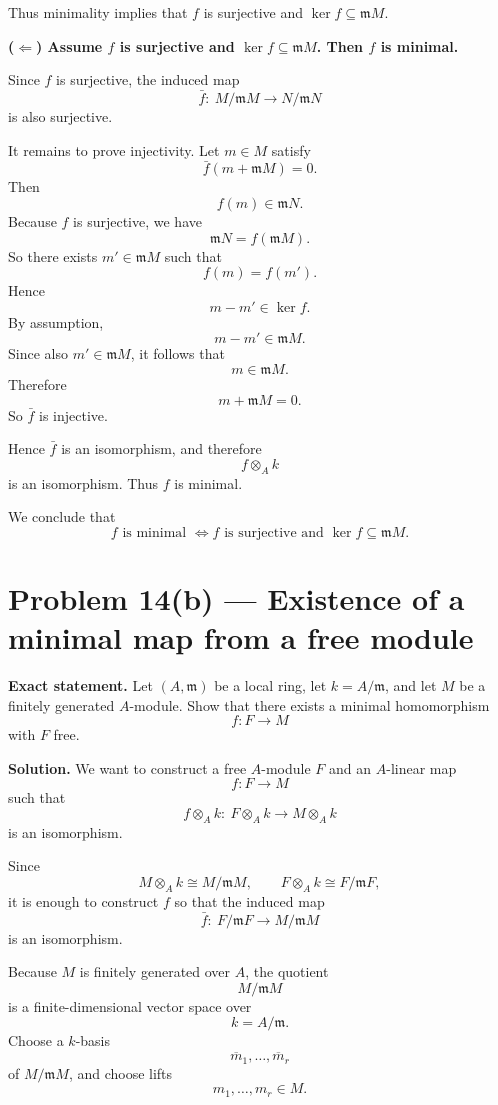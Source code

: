 \documentclass[12pt,a4paper,oneside]{report}
\theoremstyle{notespace}
\begin{document}
Thus minimality implies that \(f\) is surjective and \(\ker f\subseteq \mathfrak m M\).

\medskip

\textbf{(\(\Leftarrow\)) Assume \(f\) is surjective and \(\ker f\subseteq \mathfrak m M\). Then \(f\) is minimal.}

Since \(f\) is surjective, the induced map
\[
\bar f:\ M/\mathfrak m M \to N/\mathfrak m N
\]
is also surjective.

It remains to prove injectivity. Let \(m\in M\) satisfy
\[
\bar f(m+\mathfrak m M)=0.
\]
Then
\[
f(m)\in \mathfrak m N.
\]
Because \(f\) is surjective, we have
\[
\mathfrak m N=f(\mathfrak m M).
\]
So there exists \(m'\in \mathfrak m M\) such that
\[
f(m)=f(m').
\]
Hence
\[
m-m'\in \ker f.
\]
By assumption,
\[
m-m'\in \mathfrak m M.
\]
Since also \(m'\in \mathfrak m M\), it follows that
\[
m\in \mathfrak m M.
\]
Therefore
\[
m+\mathfrak m M=0.
\]
So \(\bar f\) is injective.

Hence \(\bar f\) is an isomorphism, and therefore
\[
f\otimes_A k
\]
is an isomorphism. Thus \(f\) is minimal.

\medskip

We conclude that
\[
\boxed{
f \text{ is minimal }
\iff
f \text{ is surjective and } \ker f\subseteq \mathfrak m M.
}
\]

\section{Problem 14(b) --- Existence of a minimal map from a free module}

\textbf{Exact statement.}
Let \((A,\mathfrak m)\) be a local ring, let \(k=A/\mathfrak m\), and let \(M\) be a finitely generated \(A\)-module. Show that there exists a minimal homomorphism
\[
f:F\to M
\]
with \(F\) free.

\textbf{Solution.}
We want to construct a free \(A\)-module \(F\) and an \(A\)-linear map
\[
f:F\to M
\]
such that
\[
f\otimes_A k:\ F\otimes_A k \to M\otimes_A k
\]
is an isomorphism.

Since
\[
M\otimes_A k \cong M/\mathfrak m M,
\qquad
F\otimes_A k \cong F/\mathfrak m F,
\]
it is enough to construct \(f\) so that the induced map
\[
\bar f:\ F/\mathfrak m F \to M/\mathfrak m M
\]
is an isomorphism.

Because \(M\) is finitely generated over \(A\), the quotient
\[
M/\mathfrak m M
\]
is a finite-dimensional vector space over
\[
k=A/\mathfrak m.
\]
Choose a \(k\)-basis
\[
\overline{m}_1,\dots,\overline{m}_r
\]
of \(M/\mathfrak m M\), and choose lifts
\[
m_1,\dots,m_r\in M.
\]
\end{document}
